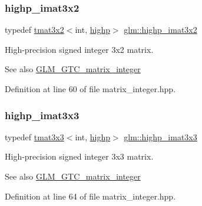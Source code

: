 \subsubsection{\texorpdfstring{highp\_imat3x2}{highp\_imat3x2}}
{\footnotesize\ttfamily typedef \mbox{\hyperlink{structglm_1_1tmat3x2}{tmat3x2}}$<$int, \mbox{\hyperlink{namespaceglm_a0f04f086094c747d227af4425893f545ac6f7eab42eacbb10d59a58e95e362074}{highp}}$>$ \mbox{\hyperlink{group__gtc__matrix__integer_ga2c8dc817124f44bc01f27777bfce983b}{glm\+::highp\+\_\+imat3x2}}}

High-\/precision signed integer 3x2 matrix. \begin{DoxySeeAlso}{See also}
\mbox{\hyperlink{group__gtc__matrix__integer}{G\+L\+M\+\_\+\+G\+T\+C\+\_\+matrix\+\_\+integer}} 
\end{DoxySeeAlso}


Definition at line 60 of file matrix\+\_\+integer.\+hpp.

\mbox{\label{group__gtc__matrix__integer_gaecb62c11fb25aadbb7eecc2da226d444}} 
\subsubsection{\texorpdfstring{highp\_imat3x3}{highp\_imat3x3}}
{\footnotesize\ttfamily typedef \mbox{\hyperlink{structglm_1_1tmat3x3}{tmat3x3}}$<$int, \mbox{\hyperlink{namespaceglm_a0f04f086094c747d227af4425893f545ac6f7eab42eacbb10d59a58e95e362074}{highp}}$>$ \mbox{\hyperlink{group__gtc__matrix__integer_gaecb62c11fb25aadbb7eecc2da226d444}{glm\+::highp\+\_\+imat3x3}}}

High-\/precision signed integer 3x3 matrix. \begin{DoxySeeAlso}{See also}
\mbox{\hyperlink{group__gtc__matrix__integer}{G\+L\+M\+\_\+\+G\+T\+C\+\_\+matrix\+\_\+integer}} 
\end{DoxySeeAlso}


Definition at line 64 of file matrix\+\_\+integer.\+hpp.

\mbox{\label{group__gtc__matrix__integer_gabcd2d8d764b11db413259ee5cafd8446}} 
